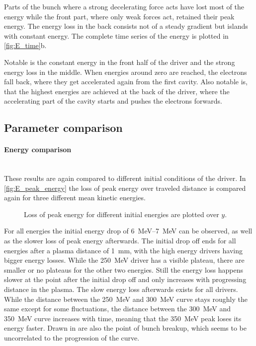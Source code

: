 \documentclass[bachelor_thesis]{subfiles}
\begin{document}
Parts of the bunch where a strong decelerating force acts have lost most of the energy while the front part, where only weak forces act, retained their peak energy. The energy loss in the back consists not of a steady gradient but islands with constant energy.
The complete time series of the energy is plotted in \autoref{fig:E_time}b.

Notable is the constant energy in the front half of the driver and the strong energy loss in the middle. When energies around zero are reached, the electrons fall back, where they get accelerated again from the first cavity.
Also notable is, that the highest energies are achieved at the back of the driver, where the accelerating part of the cavity starts and pushes the electrons forwards.

\subsection{Parameter comparison}
\paragraph*{Energy comparison}\hspace{0pt} \\
These results are again compared to different initial conditions of the driver. In \autoref{fig:E_peak_energy} the loss of peak energy over traveled distance is compared again for three different mean kinetic energies.
\begin{figure}
	\centering
	
	\caption{Loss of peak energy for different initial energies are plotted over $y$.}
	\label{fig:E_peak_energy}
\end{figure}

For all energies the initial energy drop of \qtyrange{6}{7}{\MeV} can be observed, as well as the slower loss of peak energy afterwards. The initial drop off ends for all energies after a plasma distance of \qty{1}{\mm}, with the high energy drivers having bigger energy losses. 
While the \qty{250}{\MeV} driver has a visible plateau, there are smaller or no plateaus for the other two energies. Still the energy loss happens slower at the point after the initial drop off and only increases with progressing distance in the plasma.
The slow energy loss afterwards exists for all drivers. While the distance between the \qty{250}{\MeV} and \qty{300}{\MeV} curve stays roughly the same except for some fluctuations, 
the distance between the \qty{300}{\MeV} and \qty{350}{\MeV} curve increases with time, meaning that the \qty{350}{\MeV} peak loses its energy faster. Drawn in are also the point of bunch breakup, which seems to be uncorrelated to the progression of the curve.
\end{document}
